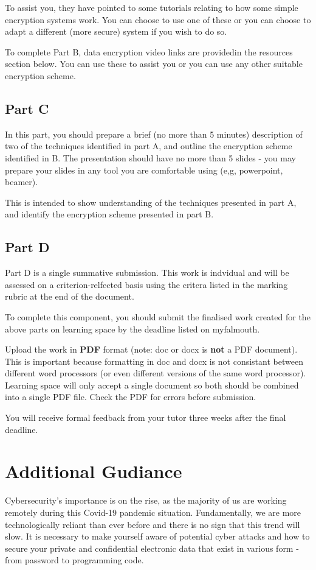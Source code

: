 \documentclass{../../fal_assignment}
\begin{document}
To assist you, they have pointed to some tutorials relating to how some simple encryption systems work. You can choose to use one of these or you can choose to adapt a different (more secure) system if you wish to do so.

To complete Part B, data encryption video links are providedin the resources section below. You can use these to assist you or you can use any other suitable encryption scheme.

\subsection*{Part C}
In this part, you should prepare a brief (no more than 5 minutes) description of two of the techniques identified in part A, and outline the encryption scheme identified in B. The presentation should have no more than 5 slides - you may prepare your slides in any tool you are comfortable using (e,g, powerpoint, beamer).

This is intended to show understanding of the techniques presented in part A, and identify the encryption scheme presented in part B.

\subsection*{Part D}
Part D is a single summative submission. This work is indvidual and will be assessed on a criterion-relfected basis using the critera listed in the marking rubric at the end of the document.

To complete this component, you should submit the finalised work created for the above parts on learning space by the deadline listed on myfalmouth. 

Upload the work in \textbf{PDF} format (note: doc or docx is \textbf{not} a PDF document). This is important because formatting in doc and docx is not consistant between different word processors (or even different versions of the same word processor). Learning space will only accept a single document so both should be combined into a single PDF file. Check the PDF for errors before submission.

You will receive formal feedback from your tutor three weeks after the final deadline.

\section*{Additional Gudiance}
Cybersecurity's importance is on the rise, as the majority of us are working remotely
during this Covid-19 pandemic situation. Fundamentally, we are more technologically
reliant than ever before and there is no sign that this trend will slow. It is necessary
to make yourself aware of potential cyber attacks and how to secure your private and
confidential electronic data that exist in various form - from password to
programming code.
\end{document}
